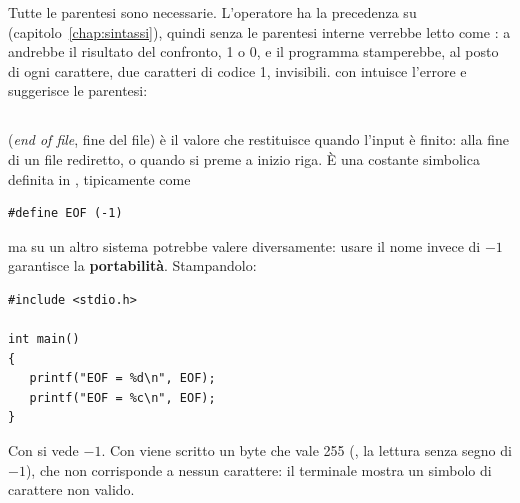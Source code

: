 Tutte le parentesi sono necessarie. L'operatore \code{!=} ha la precedenza
su \code{=} (capitolo~\ref{chap:sintassi}), quindi senza le parentesi interne
 verrebbe letto come
: a  andrebbe il risultato del
confronto, 1 o 0, e il programma stamperebbe, al posto di ogni carattere,
due caratteri di codice 1, invisibili.  con  intuisce
l'errore e suggerisce le parentesi:

\begin{console}
$ gcc -Wall -o senza_parentesi senza_parentesi.c
senza_parentesi.c: In function (*@‘@*)main(*@’@*):
senza_parentesi.c:7:11: warning: suggest parentheses around assignment used as truth value [-Wparentheses]
    7 |    while (c = getchar() != EOF) {
      |           ^
\end{console}

\subsection{}

 (\textit{end of file}, fine del file) è il valore che
 restituisce quando l'input è finito: alla fine di un file
rediretto, o quando si preme  a inizio riga. È una costante
simbolica definita in , tipicamente come

\begin{lstlisting}[style=c]
#define EOF (-1)
\end{lstlisting}

ma su un altro sistema potrebbe valere diversamente: usare il nome
 invece di $-1$ garantisce la \textbf{portabilità}. Stampandolo:

\begin{affianco}[0.5][c]
\begin{lstlisting}[style=c, name=eof.c]
#include <stdio.h>

int main()
{
   printf("EOF = %d\n", EOF);
   printf("EOF = %c\n", EOF);
}
\end{lstlisting}
\risultato
{}
\end{affianco}

Con  si vede $-1$. Con  viene scritto un byte che vale
255 (, la lettura senza segno di $-1$), che non corrisponde a
nessun carattere: il terminale mostra un simbolo di carattere non valido.

